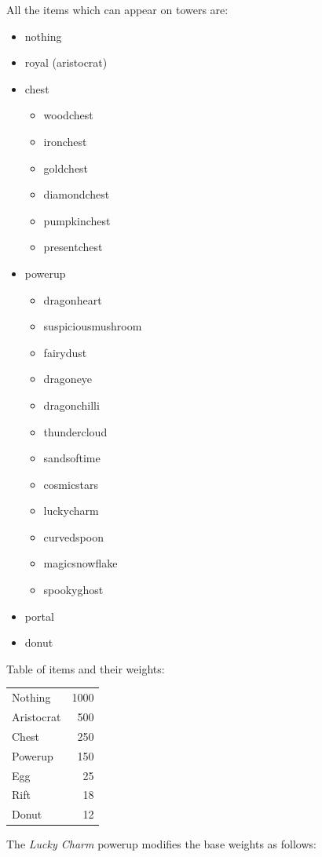 \documentclass[parskip=half]{scrartcl}
\begin{document}
All the items which can appear on towers are:
\begin{itemize}
  \item nothing
  \item royal (aristocrat)
  \item chest
    \begin{itemize}
      \item woodchest
      \item ironchest
      \item goldchest
      \item diamondchest
      \item pumpkinchest
      \item presentchest
    \end{itemize}
  \item powerup
    \begin{itemize}
      \item dragonheart
      \item suspiciousmushroom
      \item fairydust
      \item dragoneye
      \item dragonchilli
      \item thundercloud
      \item sandsoftime
      \item cosmicstars
      \item luckycharm
      \item curvedspoon
      \item magicsnowflake
      \item spookyghost
    \end{itemize}
  \item portal
  \item donut
\end{itemize}

Table of items and their weights:

\begin{tabular}{lr}
  Nothing & 1000 \\
  Aristocrat & 500 \\
  Chest & 250 \\
  Powerup & 150 \\
  Egg & 25 \\
  Rift & 18 \\
  Donut & 12\\
\end{tabular}

The \emph{Lucky Charm} powerup modifies the base weights as follows:
\end{document}
